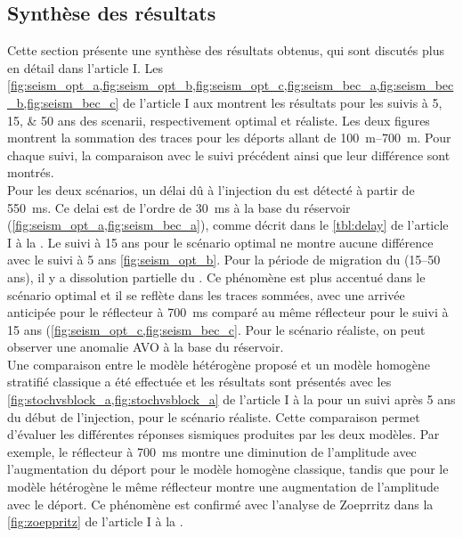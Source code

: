 \subsection{Synthèse des résultats}
Cette section présente une synthèse des résultats obtenus, qui sont discutés plus
en détail dans l'article I.
Les \cref{fig:seism_opt_a,fig:seism_opt_b,fig:seism_opt_c,fig:seism_bec_a,fig:seism_bec_b,fig:seism_bec_c}
de l'article I aux  montrent les résultats
pour les suivis à \numlist{5;15;50} ans des scenarii, respectivement optimal et réaliste. Les deux figures montrent la sommation des traces pour les
déports allant de \SIrange{100}{700}{\metre}.
Pour chaque suivi, la comparaison avec le suivi précédent ainsi que leur
différence sont montrés.\\
Pour les deux scénarios, un délai dû à l'injection du  est détecté à
partir de \SI{550}{\milli\second}. Ce delai est de l'ordre de
\SI{30}{\milli\second} à la base du réservoir
(\cref{fig:seism_opt_a,fig:seism_bec_a}), comme décrit dans le \cref{tbl:delay}
de l'article I à la . Le suivi à \num{15} ans pour le
scénario optimal ne montre aucune différence avec le suivi à \num{5} ans
\cref{fig:seism_opt_b}. Pour la période de migration du 
(\numrange{15}{50} ans), il y a dissolution partielle du . Ce phénomène
est plus accentué dans le scénario optimal et il se reflète dans les traces
sommées, avec une arrivée anticipée pour le
réflecteur à \SI{700}{\milli\second} comparé au même réflecteur pour le suivi à
\num{15} ans (\cref{fig:seism_opt_c,fig:seism_bec_c}. Pour le scénario réaliste, on
peut observer une anomalie AVO à la base du réservoir. \\
Une comparaison entre le modèle hétérogène proposé et un modèle homogène
stratifié classique a été effectuée et les résultats sont présentés avec les
\cref{fig:stochvsblock_a,fig:stochvsblock_a} de l'article I à la
 pour un suivi après \num{5} ans du début de
l’injection, pour le scénario réaliste. Cette comparaison permet d’évaluer les
différentes réponses sismiques produites par les deux modèles. Par exemple, le
réflecteur à \SI{700}{\milli\second} montre une diminution de l'amplitude avec
l'augmentation du déport pour le modèle homogène classique, tandis que pour le
modèle hétérogène le même réflecteur montre une augmentation de l'amplitude avec
le déport. Ce phénomène est confirmé avec l’analyse de Zoeprritz \citep{Aki1980}
dans la \cref{fig:zoeppritz} de l'article I à la .
